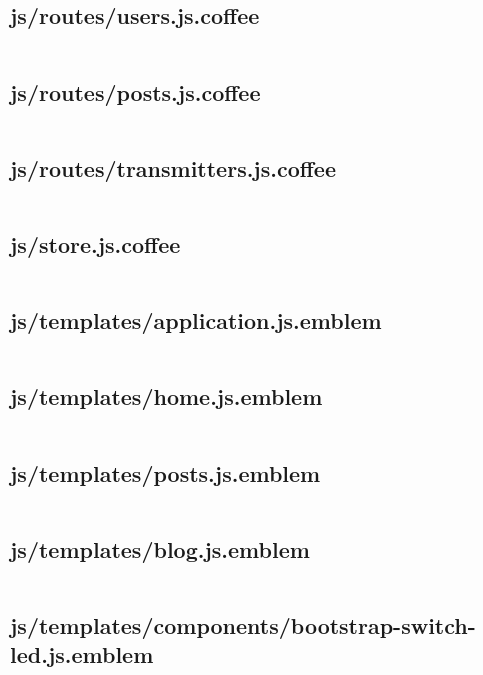 \documentclass[letterpaper, 12 pt]{article}
\begin{document}
\subsection{js/routes/users.js.coffee}
\inputminted{ruby}{../app/assets/javascripts/routes/users.js.coffee}
\subsection{js/routes/posts.js.coffee}
\inputminted{ruby}{../app/assets/javascripts/routes/posts.js.coffee}
\subsection{js/routes/transmitters.js.coffee}
\inputminted{ruby}{../app/assets/javascripts/routes/transmitters.js.coffee}

\subsection{js/store.js.coffee}
\inputminted{ruby}{../app/assets/javascripts/store.js.coffee}

\subsection{js/templates/application.js.emblem }
\inputminted{ruby}{../app/assets/javascripts/templates/application.js.emblem}
\subsection{js/templates/home.js.emblem}
\inputminted{ruby}{../app/assets/javascripts/templates/home.js.emblem}
\subsection{js/templates/posts.js.emblem}
\inputminted{ruby}{../app/assets/javascripts/templates/posts.js.emblem}
\subsection{js/templates/blog.js.emblem}
\inputminted{ruby}{../app/assets/javascripts/templates/blog.js.emblem}

\subsection{js/templates/components/bootstrap-switch-led.js.emblem}
\inputminted{ruby}{../app/assets/javascripts/templates/components/bootstrap-switch-led.js.emblem}
\end{document}
